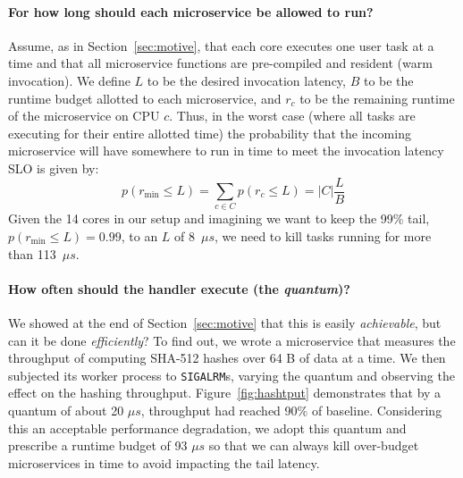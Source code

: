 \paragraph{For how long should each microservice be allowed to run?}
Assume, as in Section~\ref{sec:motive}, that each core executes one user task at a
time and that all microservice
functions are pre-compiled and resident (warm invocation).
We define $L$ to be the desired invocation latency, $B$ to be the
runtime budget allotted to each microservice, and $r_c$ to be the remaining runtime
of the microservice on CPU $c$.  Thus, in the worst case (where all tasks are
executing for their entire allotted time) the probability that the incoming
microservice will have somewhere to run in time to meet the invocation
latency SLO is given by:
\begin{equation}
p(r_\textrm{min} \le L) = \sum\limits_{c \in C} p(r_c \le L) = \big| C \big| \frac{L}{B}
\end{equation}
Given the 14 cores in our setup and imagining we want to keep the 99\% tail,
$p(r_\textrm{min} \le L) = 0.99$, to an $L$ of 8~$\mu{}s$, we need to kill tasks
running for more than 113~$\mu{}s$.

\paragraph{How often should the handler execute (the \emph{quantum})?}
We showed at the end of Section~\ref{sec:motive} that this is easily
\textit{achievable}, but can it be done \textit{efficiently}?  To find out, we wrote
a microservice that measures the throughput of computing SHA-512 hashes over 64 B of
data at a time.  We then subjected its worker process to \texttt{SIGALRM}s, varying
the quantum and observing the effect on the hashing throughput.
Figure~\ref{fig:hashtput} demonstrates that by a quantum of about 20 $\mu{}s$,
throughput had reached 90\% of baseline.  Considering this an acceptable performance
degradation, we adopt this quantum and prescribe a runtime budget of 93 $\mu{}s$ so
that we can always kill over-budget microservices in time to avoid impacting the tail
latency.

